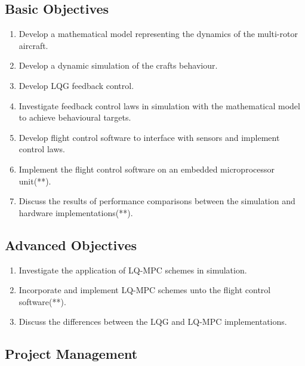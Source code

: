 \documentclass[12pt,a4paper,twoside]{report}
\begin{document}
				\subsection*{Basic Objectives}
				
					\begin{enumerate}
						\item
							Develop a mathematical model representing the dynamics of the multi-rotor aircraft.
						\item
							Develop a dynamic simulation of the crafts behaviour.
						\item
							Develop LQG feedback control.
						\item
							Investigate feedback control laws in simulation with the mathematical model to achieve behavioural targets.
						\item
							Develop flight control software to interface with sensors and implement control laws.
						\item
							Implement the flight control software on an embedded microprocessor unit(**).
						\item
							Discuss the results of performance comparisons between the simulation and hardware implementations(**).
					\end{enumerate}
				
				\subsection*{Advanced Objectives}
				
					\begin{enumerate}
						\item
							Investigate the application of LQ-MPC schemes in simulation.
						\item	
							Incorporate and implement LQ-MPC schemes unto the flight control software(**).
						\item	
							Discuss the differences between the LQG and LQ-MPC implementations.
					\end{enumerate}
				
		\subsection{Project Management}
			
\end{document}
